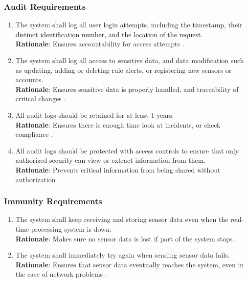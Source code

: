 \documentclass[]{article}
\begin{document}
\subsubsection{Audit Requirements}
\label{ssub:audit_requirements}
\begin{enumerate}[{SR-AU}1. ]
	\item The system shall log all user login attempts, including the timestamp, their distinct identification number, and the location of the request. \\
    \textbf{Rationale}: Ensures accountability for access attempts \cite{english2020}.

    \item The system shall log all access to sensitive data, and data modification such as updating, adding or deleting rule alerts, or registering new sensors or accounts. \\
    \textbf{Rationale}: Ensures sensitive data is properly handled, and traceability of critical changes \cite{secoda2025}.

    \item All audit logs should be retained for at least 1 years. \\
    \textbf{Rationale}: Ensures there is enough time look at incidents, or check compliance \cite{Dreshner2025}.

    \item All audit logs should be protected with access controls to ensure that only authorized security can view or extract information from them. \\
    \textbf{Rationale}: Prevents critical information from being shared without authorization \cite{Dreshner2025}.
    
\end{enumerate}

\subsubsection{Immunity Requirements}
\label{ssub:immunity_requirements}
\begin{enumerate}[{SR-IM}1. ]
	\item The system shall keep receiving and storing sensor data even when the real-time processing system is down. \\
    \textbf{Rationale}: Makes sure no sensor data is lost if part of the system stops \cite{canRead}.

    \item The system shall immediately try again when sending sensor data fails.\\
    \textbf{Rationale}: Ensures that sensor data eventually reaches the system, even in the case of network problems \cite{canRead}.
\end{enumerate}
\end{document}
